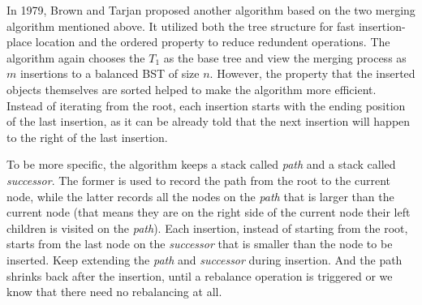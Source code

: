 \documentclass[12pt]{article}
\begin{document}
In 1979, Brown and Tarjan proposed another algorithm based on the two merging algorithm mentioned above. It utilized both the tree structure for fast insertion-place location and the ordered property to reduce redundent operations. The algorithm again chooses the $T_1$ as the base tree and view the merging process as $m$ insertions to a balanced BST of size $n$. However, the property that the inserted objects themselves are sorted helped to make the algorithm more efficient. Instead of iterating from the root, each insertion starts with the ending position of the last insertion, as it can be already told that the next insertion will happen to the right of the last insertion. 

To be more specific, the algorithm keeps a stack called \textit{path} and a stack called \textit{successor}. The former is used to record the path from the root to the current node, while the latter records all the nodes on the \textit{path} that is larger than the current node (that means they are on the right side of the current node their left children is visited on the \textit{path}). Each insertion, instead of starting from the root, starts from the last node on the \textit{successor} that is smaller than the node to be inserted. Keep extending the \textit{path} and \textit{successor} during insertion. And the path shrinks back after the insertion, until a rebalance operation is triggered or we know that there need no rebalancing at all.
\end{document}
